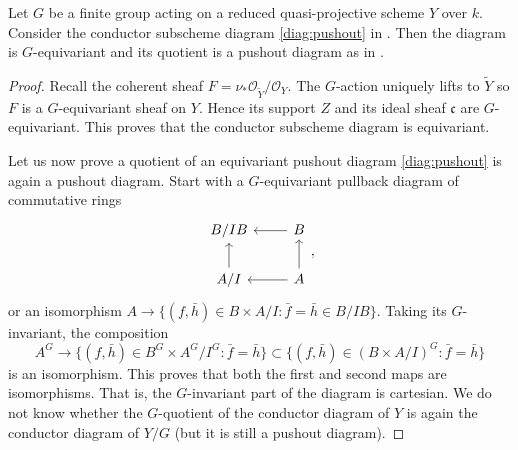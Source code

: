 \documentclass[reqno, letterpaper]{amsart}
\numberwithin{equation}{subsection}
\let\to\longrightarrow
\begin{document}
			\begin{lemma} \label{lem:quotient of conductor}
				Let $G$ be a finite group acting on a reduced quasi-projective scheme $Y$ over $k$. Consider the conductor subscheme diagram \eqref{diag:pushout} in . Then the diagram is $G$-equivariant and its quotient is a pushout diagram as in .
			\end{lemma}
			\begin{proof}
				Recall the coherent sheaf $F = \nu_* \mathcal O_{\tilde Y}/\mathcal O_Y$. The $G$-action uniquely lifts to $\tilde Y$ so $F$ is a $G$-equivariant sheaf on $Y$. Hence its support $Z$ and its ideal sheaf $\mathfrak c$ are $G$-equivariant. This proves that the conductor subscheme diagram is equivariant.
				
				Let us now prove a quotient of an equivariant pushout diagram \eqref{diag:pushout} is again a pushout diagram. Start with a $G$-equivariant pullback diagram of commutative rings
				\[\begin{tikzcd}
					B/IB & B \arrow[l] \\
					A/I \arrow[u] & A \arrow[l] \arrow[u]
				\end{tikzcd},\]
				or an isomorphism $A \to \{ (f, \bar h) \in B \times A/I : \bar f = \bar h \in B/IB \}$. Taking its $G$-invariant, the composition
				\[ A^G \to \{ (f, \bar h) \in B^G \times A^G/I^G : \bar f = \bar h\} \subset \{ (f, \bar h) \in (B \times A/I)^G : \bar f = \bar h\} \]
				is an isomorphism. This proves that both the first and second maps are isomorphisms. That is, the $G$-invariant part of the diagram is cartesian. We do not know whether the $G$-quotient of the conductor diagram of $Y$ is again the conductor diagram of $Y/G$ (but it is still a pushout diagram).
			\end{proof}
			
			
			
			
\printbibliography
\end{document}
